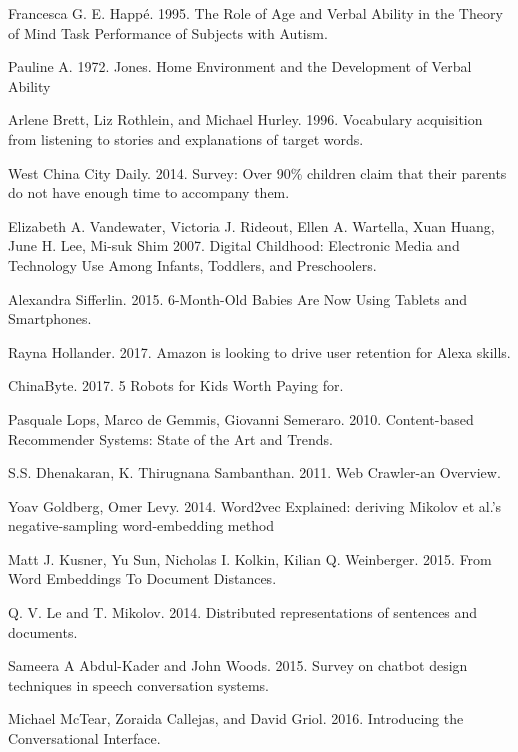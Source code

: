 \documentclass[twoside,twocolumn]{article}
\begin{document}
\begin{thebibliography}{99} %

Francesca G. E. Happé. 1995. The Role of Age and Verbal Ability in the Theory of Mind Task Performance of Subjects with Autism.

Pauline A. 1972. Jones. Home Environment and the Development of Verbal Ability

Arlene Brett, Liz Rothlein, and Michael Hurley. 1996. Vocabulary acquisition from listening to stories and explanations of target words.

West China City Daily. 2014. Survey: Over 90\% children claim that their parents do not have enough time to accompany them.

Elizabeth A. Vandewater, Victoria J. Rideout, Ellen A. Wartella, Xuan Huang, June H. Lee, Mi-suk Shim 2007. Digital Childhood: Electronic Media and Technology Use Among Infants, Toddlers, and Preschoolers.

Alexandra Sifferlin. 2015. 6-Month-Old Babies Are Now Using Tablets and Smartphones.

Rayna Hollander. 2017. Amazon is looking to drive user retention for Alexa skills.

ChinaByte. 2017. 5 Robots for Kids Worth Paying for.

Pasquale Lops, Marco de Gemmis, Giovanni Semeraro. 2010. Content-based Recommender Systems: State of the Art and Trends.

S.S. Dhenakaran, K. Thirugnana Sambanthan. 2011. Web Crawler-an Overview.

Yoav Goldberg, Omer Levy. 2014. Word2vec Explained: deriving Mikolov et al.'s negative-sampling word-embedding method

Matt J. Kusner, Yu Sun, Nicholas I. Kolkin, Kilian Q. Weinberger. 2015. From Word Embeddings To Document Distances.

Q. V. Le and T. Mikolov. 2014. Distributed representations of sentences and documents.

Sameera A Abdul-Kader and John Woods. 2015. Survey on chatbot
design techniques in speech conversation systems.

Michael McTear, Zoraida Callejas, and David Griol. 2016. Introducing the Conversational Interface.

\bibitem{}
\bibitem{}
\bibitem{}
\bibitem{}
\bibitem{}
 
\end{thebibliography}

\end{document}
